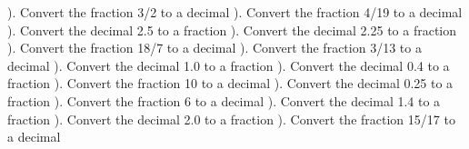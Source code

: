 \documentclass{article}%
\begin{document}
). Convert the fraction 3/2 to a decimal%
\newline%
\newline%
). Convert the fraction 4/19 to a decimal%
\newline%
\newline%
). Convert the decimal 2.5 to a fraction%
\newline%
\newline%
). Convert the decimal 2.25 to a fraction%
\newline%
\newline%
). Convert the fraction 18/7 to a decimal%
\newline%
\newline%
). Convert the fraction 3/13 to a decimal%
\newline%
\newline%
). Convert the decimal 1.0 to a fraction%
\newline%
\newline%
). Convert the decimal 0.4 to a fraction%
\newline%
\newline%
). Convert the fraction 10 to a decimal%
\newline%
\newline%
). Convert the decimal 0.25 to a fraction%
\newline%
\newline%
). Convert the fraction 6 to a decimal%
\newline%
\newline%
). Convert the decimal 1.4 to a fraction%
\newline%
\newline%
). Convert the decimal 2.0 to a fraction%
\newline%
\newline%
). Convert the fraction 15/17 to a decimal%
\end{document}
